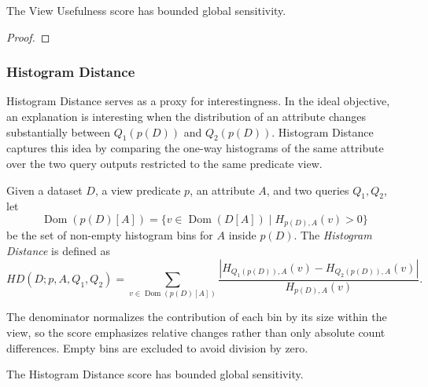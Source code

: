 \begin{proposition}
\label{prop:usefulness-sensitivity}
The View Usefulness score has bounded global sensitivity.
\end{proposition}

\begin{proof}
\end{proof}

\subsubsection{Histogram Distance}
\label{subsubsec:histogram-distance}

Histogram Distance serves as a proxy for interestingness.
In the ideal objective, an explanation is interesting when the distribution of an attribute changes substantially between $Q_1(p(D))$ and $Q_2(p(D))$.
Histogram Distance captures this idea by comparing the one-way histograms of the same attribute over the two query outputs restricted to the same predicate view.

\begin{definition}
Given a dataset $D$, a view predicate $p$, an attribute $A$, and two queries $Q_1,Q_2$, let
\[
\operatorname{Dom}(p(D)[A])=\{v \in \operatorname{Dom}(D[A]) \mid H_{p(D),A}(v)>0\}
\]
be the set of non-empty histogram bins for $A$ inside $p(D)$.
The \emph{Histogram Distance} is defined as
\begin{equation}
HD(D;p,A,Q_1,Q_2)
=
\sum_{v \in \operatorname{Dom}(p(D)[A])}
\frac{\left|H_{Q_1(p(D)),A}(v)-H_{Q_2(p(D)),A}(v)\right|}{H_{p(D),A}(v)}.
\label{eq:hd-definition}
\end{equation}
\end{definition}

The denominator normalizes the contribution of each bin by its size within the view, so the score emphasizes relative changes rather than only absolute count differences.
Empty bins are excluded to avoid division by zero.

\begin{proposition}
\label{prop:hd-sensitivity}
The Histogram Distance score has bounded global sensitivity.
\end{proposition}


